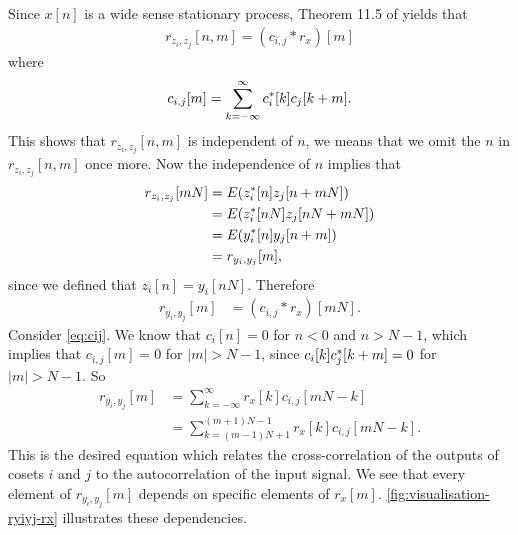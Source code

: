 \documentclass[a4paper, openany, oneside]{memoir}
\begin{document}
Since $x[n]$ is a wide sense stationary process, Theorem 11.5 of \cite{yates2005probability} yields that
\begin{align} \label{eq:crij-rx}
    r_{z_i,z_j}[n,m] = (c_{i,j} \ast r_{x})[m]
\end{align}
where
\begin{align} \label{eq:cij}
    c_{i,j}[m] = \sum_{k=-\infty}^{\infty}c^*_i[k] c_j[k+m].
\end{align}
This shows that $r_{z_i,z_j}[n,m]$ is independent of $n$, we means that we omit the $n$ in $r_{z_i,z_j}[n,m]$  once more. Now the independence of $n$ implies that
\begin{align*}
    r_{z_i,z_j}[mN] &= E(z^*_i[n]z_j[n+mN]) \\
    &= E(z^*_i[nN]z_j[nN+mN]) \\
    &= E(y^*_i[n]y_j[n+m]) \\
    &= r_{y_i,y_j}[m],
\end{align*}
since we defined that $z_i[n]=y_i[nN]$. Therefore
\begin{align*}
    r_{y_i,y_j}[m] &= (c_{i,j}\ast r_{x})[mN].
\end{align*}
Consider \cref{eq:cij}. We know that $c_i[n]=0$ for $n < 0$ and $n > N-1$, which implies that $c_{i,j}[m]=0$ for $|m| > N-1$, since $c_i[k]c^*_j[k+m]=0$ for $|m| > N-1$. So
\begin{align} \label{eq:ryiyj-rx}
    r_{y_i,y_j}[m] &= \sum_{k=-\infty}^{\infty}r_{x}[k]c_{i,j}[mN-k] \nonumber \\
    &= \sum_{k=(m-1)N+1}^{(m+1)N-1}r_{x}[k]c_{i,j}[mN-k].
\end{align}
This is the desired equation which relates the cross-correlation of the outputs of cosets $i$ and $j$ to the autocorrelation of the input signal.
We see that every element of $r_{y_i,y_j}[m]$ depends on specific elements of $r_x[m]$. \cref{fig:visualisation-ryiyj-rx} illustrates these dependencies.
\end{document}

